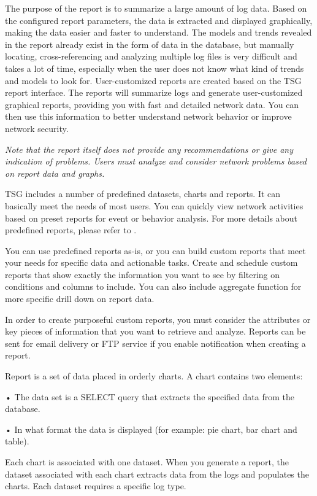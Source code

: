 The purpose of the report is to summarize a large amount of log data. Based on the configured report parameters, the data is extracted and displayed graphically, making the data easier and faster to understand. The models and trends revealed in the report already exist in the form of data in the database, but manually locating, cross-referencing and analyzing multiple log files is very difficult and takes a lot of time, especially when the user does not know what kind of trends and models to look for. User-customized reports are created based on the TSG report interface. The reports will summarize logs and generate user-customized graphical reports, providing you with fast and detailed network data. You can then use this information to better understand network behavior or improve network security. 


\notemark\textit{Note that the report itself does not provide any recommendations or give any indication of problems. Users must analyze and consider network problems based on report data and graphs.}


TSG includes a number of predefined datasets, charts and reports. It can basically meet the needs of most users. 
You can quickly view network activities based on preset reports for event or behavior analysis. 
For more details about predefined reports, please refer to \hyperlink{link:Appendix D Predefined Reports}{\color{linkblue}{Appendix D Predefined Reports}}.


You can use predefined reports as-is, or you can build custom reports that meet your needs for specific data and actionable tasks. Create and schedule custom reports that show exactly the information you want to see by filtering on conditions and columns to include. You can also include aggregate function for more specific drill down on report data.


In order to create purposeful custom reports, you must consider the attributes or key pieces of information that you want to retrieve and analyze. Reports can be sent for email delivery or FTP service if you enable notification when creating a report. 


Report is a set of data placed in orderly charts. A chart contains two elements: 


• The data set is a SELECT query that extracts the specified data from the database. 


• In what format the data is displayed (for example: pie chart, bar chart and table). 


Each chart is associated with one dataset. When you generate a report, the dataset associated with each chart extracts data from the logs and populates the charts. Each dataset requires a specific log type.


